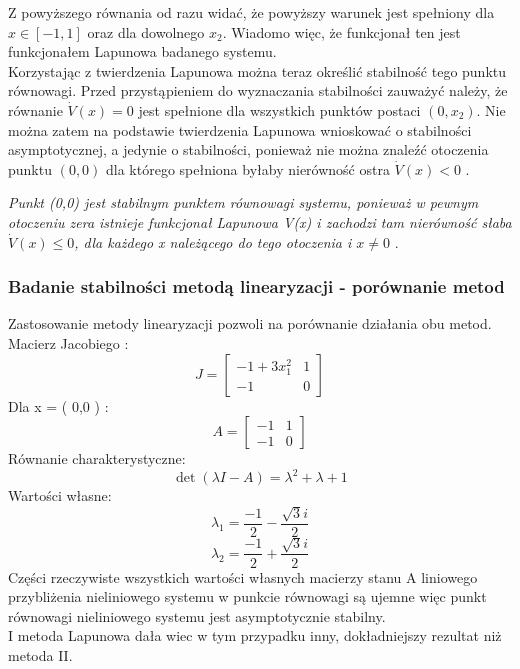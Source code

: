 \documentclass[a4paper,11pt]{article}
\begin{document}
Z powyższego równania od razu widać, że powyższy warunek jest spełniony dla \( x \in [-1, 1] \) oraz dla dowolnego \( x_{2} \). Wiadomo więc, że funkcjonał ten jest funkcjonałem Lapunowa badanego systemu. \\
Korzystając z twierdzenia Lapunowa można teraz określić stabilność tego punktu równowagi. Przed przystąpieniem do wyznaczania stabilności zauważyć należy, że równanie \( \dot{V}(x) = 0 \) jest spełnione dla wszystkich punktów postaci \( (0,x_{2}) \). Nie można zatem na podstawie twierdzenia Lapunowa wnioskować o stabilności asymptotycznej, a jedynie o stabilności, ponieważ nie można znaleźć otoczenia punktu \( (0,0) \) dla którego spełniona byłaby nierówność ostra \( \dot{V}(x) < 0 \) .
\begin{center}
\textit{Punkt (0,0) jest stabilnym punktem równowagi systemu, ponieważ w pewnym otoczeniu zera istnieje funkcjonał Lapunowa V(x) i zachodzi tam nierówność słaba \( \dot{V}(x) \leq 0 \), dla każdego x należącego do tego otoczenia i \( x \neq 0 \) } .
\end{center}
\subsubsection{Badanie stabilności metodą linearyzacji - porównanie metod}
Zastosowanie metody linearyzacji pozwoli na porównanie działania obu metod.
Macierz Jacobiego : 
\begin{equation*}
J=\begin{bmatrix}
-1+3x_{1}^{2} & 1 \\
-1 & 0 
\end{bmatrix}
\end{equation*}
Dla x = ( 0,0 ) : \\
\begin{equation*}
A=\begin{bmatrix}
-1 & 1 \\
-1 & 0 
\end{bmatrix}
\end{equation*}
Równanie charakterystyczne: 
\begin{equation*}
\det{(\lambda I-A)}=\lambda^{2}+\lambda+1
\end{equation*}
Wartości własne:
\begin{equation*}
\lambda_{1}=\frac{-1}{2}-\frac{\sqrt{3}i}{2}
\end{equation*}
\begin{equation*}
\lambda_{2}=\frac{-1}{2}+\frac{\sqrt{3}i}{2}
\end{equation*}
Części rzeczywiste wszystkich wartości własnych macierzy stanu A liniowego przybliżenia nieliniowego systemu w punkcie równowagi są ujemne więc punkt równowagi nieliniowego systemu jest asymptotycznie stabilny. \\ 
I metoda Lapunowa dała wiec w tym przypadku inny, dokładniejszy rezultat niż metoda II. 
\end{document}
